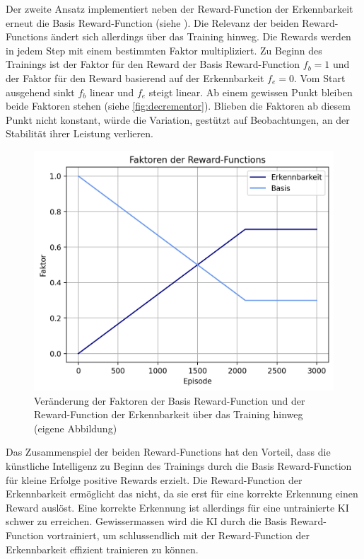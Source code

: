 Der zweite Ansatz implementiert neben der Reward-Function der Erkennbarkeit
erneut die Basis Reward-Function (siehe ). Die Relevanz
der beiden Reward-Functions ändert sich allerdings über das Training hinweg. Die
Rewards werden in jedem Step mit einem bestimmten Faktor multipliziert. Zu
Beginn des Trainings ist der Faktor für den Reward der Basis Reward-Function
$f_b = 1$ und der Faktor für den Reward basierend auf der Erkennbarkeit $f_e =
0$. Vom Start ausgehend sinkt $f_b$ linear und $f_e$ steigt linear. Ab einem
gewissen Punkt bleiben beide Faktoren stehen (siehe \autoref{fig:decrementor}).
Blieben die Faktoren ab diesem Punkt nicht konstant, würde die Variation,
gestützt auf Beobachtungen, an der Stabilität ihrer Leistung verlieren.
 
\begin{figure}[!ht]
 \centering
 \includegraphics[width=\textwidth-2cm]{images/methode/decrementor.png}
 \caption{Veränderung der Faktoren der Basis Reward-Function und der Reward-Function der Erkennbarkeit über das Training hinweg (eigene Abbildung)}\label{fig:decrementor}
\end{figure}
 
Das Zusammenspiel der beiden Reward-Functions hat den Vorteil, dass die
künstliche Intelligenz zu Beginn des Trainings durch die Basis Reward-Function
für kleine Erfolge positive Rewards erzielt. Die Reward-Function der
Erkennbarkeit ermöglicht das nicht, da sie erst für eine korrekte Erkennung
einen Reward auslöst. Eine korrekte Erkennung ist allerdings für eine
untrainierte KI schwer zu erreichen. Gewissermassen wird die KI durch die Basis
Reward-Function vortrainiert, um schlussendlich mit der Reward-Function der
Erkennbarkeit effizient trainieren zu können.
 
